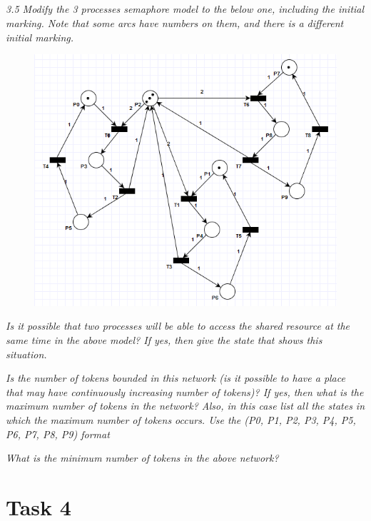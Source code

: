 \documentclass[letterpaper]{article}
\begin{document}
\subsection{}
\textit{ 3.5  Modify the 3 processes semaphore model to the below one, including the initial marking.
 Note that some arcs have numbers on them, and there is a different initial marking.
}

\begin{figure}[H]
 \centering
 \includegraphics[width=\textwidth]{image5.png}
\end{figure}

\textit{Is it possible that two processes will be able to access the shared resource at the same time in the above model? If yes, then give the state that shows this situation.}

\vspace{2cm}
\textit{Is the number of tokens bounded in this network (is it possible to have a place that may have continuously increasing number of tokens)? If yes, then what is the maximum number of tokens in the network? Also, in this case list all the states in which the maximum number of tokens occurs.
 Use the (P0, P1, P2, P3, P4, P5, P6, P7, P8, P9) format
}


\vspace{1cm}
\textit{What is the minimum number of tokens in the above network?}

\section{Task 4}
\end{document}

